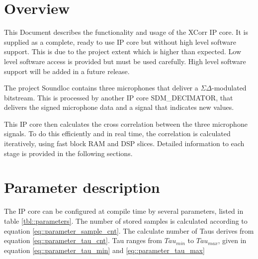 


\maketitle


\section{Overview}
\label{sec:overview}

This Document describes the functionality and usage of the XCorr IP core.
It is supplied as a complete, ready to use IP core but without high level software support.
This is due to the project extent which is higher than expected.
Low level software access is provided but must be used carefully.
High level software support will be added in a future release.

The project Soundloc contains three microphones that deliver a $\Sigma\Delta$-modulated bitstream.
This is processed by another IP core SDM\_DECIMATOR, that delivers the signed microphone data and a signal that indicates new values.

This IP core then calculates the cross correlation between the three microphone signals.
To do this efficiently and in real time, the correlation is calculated iteratively, using fast block RAM and DSP slices.
Detailed information to each stage is provided in the following sections.

\section{Parameter description}
\label{sec::parameters}

The IP core can be configured at compile time by several parameters, listed in table \ref{tbl::parameters}.
The number of stored samples is calculated according to equation \ref{eq::parameter_sample_cnt}.
The calculate number of Taus derives from equation \ref{eq::parameter_tau_cnt}.
Tau ranges from $Tau_{min}$ to $Tau_{max}$, given in equation \ref{eq::parameter_tau_min} and \ref{eq::parameter_tau_max}

